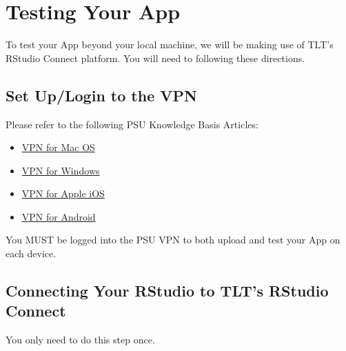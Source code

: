 \documentclass[
]{book}
\providecommand{\tightlist}{%
  \setlength{\itemsep}{0pt}\setlength{\parskip}{0pt}}
\begin{document}
\hypertarget{testing}{%
\section{Testing Your App}\label{testing}}

To test your App beyond your local machine, we will be making use of TLT's RStudio Connect platform. You will need to following these directions.

\hypertarget{set-uplogin-to-the-vpn}{%
\subsection{Set Up/Login to the VPN}\label{set-uplogin-to-the-vpn}}

Please refer to the following PSU Knowledge Basis Articles:

\begin{itemize}
\tightlist
\item
  \href{https://pennstate.service-now.com/sp?id=kb_article\&sys_id=c628298bdb1d6f44a318fb671d961971}{VPN for Mac OS}
\item
  \href{https://pennstate.service-now.com/sp?id=kb_article_view\&sys_kb_id=c151310cdb85abc84222778ebf961957}{VPN for Windows}
\item
  \href{https://pennstate.service-now.com/sp?id=kb_article_view\&sys_kb_id=1de84eb6dbd5ab44a318fb671d9619a5}{VPN for Apple iOS}
\item
  \href{https://pennstate.service-now.com/sp?id=kb_article_view\&sys_kb_id=a35e0a7edb59ab44a318fb671d961964}{VPN for Android}
\end{itemize}

You MUST be logged into the PSU VPN to both upload and test your App on each device.

\hypertarget{connecting-your-rstudio-to-tlts-rstudio-connect}{%
\subsection{Connecting Your RStudio to TLT's RStudio Connect}\label{connecting-your-rstudio-to-tlts-rstudio-connect}}

You only need to do this step once.
\end{document}
